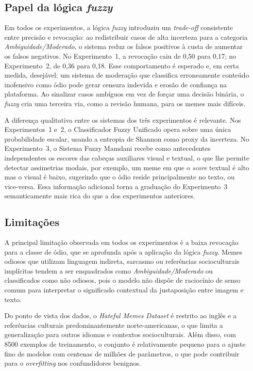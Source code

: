 \subsection{Papel da lógica \textit{fuzzy}}

Em todos os experimentos, a lógica \textit{fuzzy} introduziu um \textit{trade-off} consistente entre precisão e revocação: ao redistribuir casos de alta incerteza para a categoria \textit{Ambiguidade/Moderado}, o sistema reduz os falsos positivos à custa de aumentar os falsos negativos. No Experimento~1, a revocação caiu de 0,50 para 0,17; no Experimento~2, de 0,36 para 0,18. Esse comportamento é esperado e, em certa medida, desejável: um sistema de moderação que classifica erroneamente conteúdo inofensivo como ódio pode gerar censura indevida e erosão de confiança na plataforma. Ao sinalizar casos ambíguos em vez de forçar uma decisão binária, o \textit{fuzzy} cria uma terceira via, como a revisão humana, para os memes mais difíceis.

A diferença qualitativa entre os sistemas dos três experimentos é relevante. Nos Experimentos~1 e~2, o Classificador Fuzzy Unificado opera sobre uma única probabilidade escalar, usando a entropia de Shannon como proxy da incerteza. No Experimento~3, o Sistema Fuzzy Mamdani recebe como antecedentes independentes os escores das cabeças auxiliares visual e textual, o que lhe permite detectar assimetrias modais, por exemplo, um meme em que o \textit{score} textual é alto mas o visual é baixo, sugerindo que o ódio reside principalmente no texto, ou vice-versa. Essa informação adicional torna a graduação do Experimento~3 semanticamente mais rica do que a dos experimentos anteriores.

\subsection{Limitações}

A principal limitação observada em todos os experimentos é a baixa revocação para a classe de ódio, que se aprofunda após a aplicação da lógica \textit{fuzzy}. Memes odiosos que utilizam linguagem indireta, sarcasmo ou referências socioculturais implícitas tendem a ser enquadrados como \textit{Ambiguidade/Moderado} ou classificados como não odiosos, pois o modelo não dispõe de raciocínio de senso comum para interpretar o significado contextual da justaposição entre imagem e texto.

Do ponto de vista dos dados, o \textit{Hateful Memes Dataset} é restrito ao inglês e a referências culturais predominantemente norte-americanas, o que limita a generalização para outros idiomas e contextos socioculturais. Além disso, com 8500 exemplos de treinamento, o conjunto é relativamente pequeno para o ajuste fino de modelos com centenas de milhões de parâmetros, o que pode contribuir para o \textit{overfitting} nos confundidores benignos.

